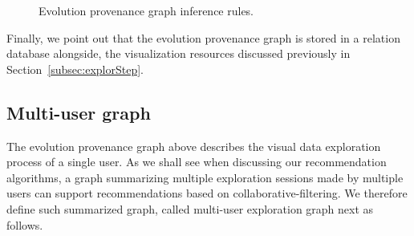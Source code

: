 \begin{figure}[t]
 \centering
{}

 \caption{\label{fig:Evoinf}Evolution provenance graph inference rules.}
 \end{figure}



Finally, we point out that the evolution provenance graph is stored in a relation database alongside, the visualization resources discussed previously in Section~\ref{subsec:explorStep}.


 



	\subsection{Multi-user graph}  
The evolution provenance graph above describes the visual data exploration process of a single user. As we shall see when discussing our recommendation algorithms, a graph summarizing multiple exploration sessions made by multiple users can %
support recommendations based on collaborative-filtering.
We therefore define such summarized graph, called multi-user exploration graph next as follows.

